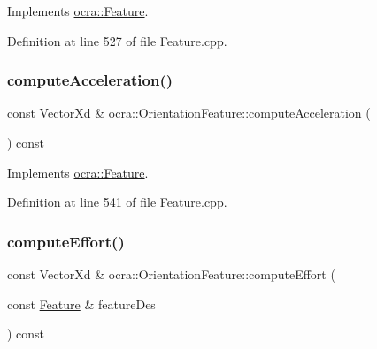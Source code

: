 Implements \hyperlink{classocra_1_1Feature_a4a5973d27459d2dececec8dc73038df8}{ocra\+::\+Feature}.



Definition at line 527 of file Feature.\+cpp.

\hypertarget{classocra_1_1OrientationFeature_a948340f06a913d3c56fb306f65c3ad81}{}\label{classocra_1_1OrientationFeature_a948340f06a913d3c56fb306f65c3ad81} 
\subsubsection{\texorpdfstring{compute\+Acceleration()}{computeAcceleration()}\hspace{0.1cm}{\footnotesize\ttfamily [2/2]}}
{\footnotesize\ttfamily const Vector\+Xd \& ocra\+::\+Orientation\+Feature\+::compute\+Acceleration (\begin{DoxyParamCaption}{ }\end{DoxyParamCaption}) const\hspace{0.3cm}{\ttfamily [virtual]}}



Implements \hyperlink{classocra_1_1Feature_aa42b61d4255116caa92042d01ca36b79}{ocra\+::\+Feature}.



Definition at line 541 of file Feature.\+cpp.

\hypertarget{classocra_1_1OrientationFeature_a3aef6b9e83419882a81792804d8da00e}{}\label{classocra_1_1OrientationFeature_a3aef6b9e83419882a81792804d8da00e} 
\subsubsection{\texorpdfstring{compute\+Effort()}{computeEffort()}\hspace{0.1cm}{\footnotesize\ttfamily [1/2]}}
{\footnotesize\ttfamily const Vector\+Xd \& ocra\+::\+Orientation\+Feature\+::compute\+Effort (\begin{DoxyParamCaption}\item[{const \hyperlink{classocra_1_1Feature}{Feature} \&}]{feature\+Des }\end{DoxyParamCaption}) const\hspace{0.3cm}{\ttfamily [virtual]}}



